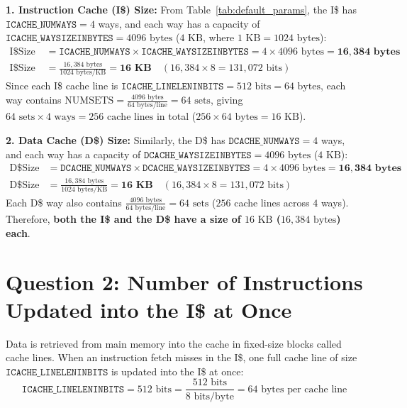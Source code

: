 \documentclass[11pt,a4paper]{article}
\begin{document}
\textbf{1. Instruction Cache (I\$) Size:}
From Table~\ref{tab:default_params}, the I\$ has $\texttt{ICACHE\_NUMWAYS} = 4$ ways, and each way has a capacity of $\texttt{ICACHE\_WAYSIZEINBYTES} = 4096\text{ bytes}$ ($4\text{ KB}$, where $1\text{ KB} = 1024\text{ bytes}$):
\begin{align*}
\text{I\$ Size (in Bytes)} &= \texttt{ICACHE\_NUMWAYS} \times \texttt{ICACHE\_WAYSIZEINBYTES} = 4 \times 4096\text{ bytes} = \mathbf{16{,}384\text{ bytes}} \\
\text{I\$ Size (in KB)} &= \frac{16{,}384\text{ bytes}}{1024\text{ bytes/KB}} = \mathbf{16\text{ KB}} \quad (16{,}384 \times 8 = 131{,}072\text{ bits})
\end{align*}
Since each I\$ cache line is $\texttt{ICACHE\_LINELENINBITS} = 512\text{ bits} = 64\text{ bytes}$, each way contains $\text{NUMSETS} = \frac{4096\text{ bytes}}{64\text{ bytes/line}} = 64\text{ sets}$, giving $64\text{ sets} \times 4\text{ ways} = 256\text{ cache lines}$ in total ($256 \times 64\text{ bytes} = 16\text{ KB}$).

\textbf{2. Data Cache (D\$) Size:}
Similarly, the D\$ has $\texttt{DCACHE\_NUMWAYS} = 4$ ways, and each way has a capacity of $\texttt{DCACHE\_WAYSIZEINBYTES} = 4096\text{ bytes}$ ($4\text{ KB}$):
\begin{align*}
\text{D\$ Size (in Bytes)} &= \texttt{DCACHE\_NUMWAYS} \times \texttt{DCACHE\_WAYSIZEINBYTES} = 4 \times 4096\text{ bytes} = \mathbf{16{,}384\text{ bytes}} \\
\text{D\$ Size (in KB)} &= \frac{16{,}384\text{ bytes}}{1024\text{ bytes/KB}} = \mathbf{16\text{ KB}} \quad (16{,}384 \times 8 = 131{,}072\text{ bits})
\end{align*}
Each D\$ way also contains $\frac{4096\text{ bytes}}{64\text{ bytes/line}} = 64\text{ sets}$ ($256$ cache lines across $4$ ways). Therefore, \textbf{both the I\$ and the D\$ have a size of $16\text{ KB}$ ($16{,}384\text{ bytes}$) each}.


\section{Question 2: Number of Instructions Updated into the I\$ at Once}

Data is retrieved from main memory into the cache in fixed-size blocks called cache lines. When an instruction fetch misses in the I\$, one full cache line of size $\texttt{ICACHE\_LINELENINBITS}$ is updated into the I\$ at once:
\[
\texttt{ICACHE\_LINELENINBITS} = 512\text{ bits} = \frac{512\text{ bits}}{8\text{ bits/byte}} = 64\text{ bytes per cache line}
\]
\end{document}
